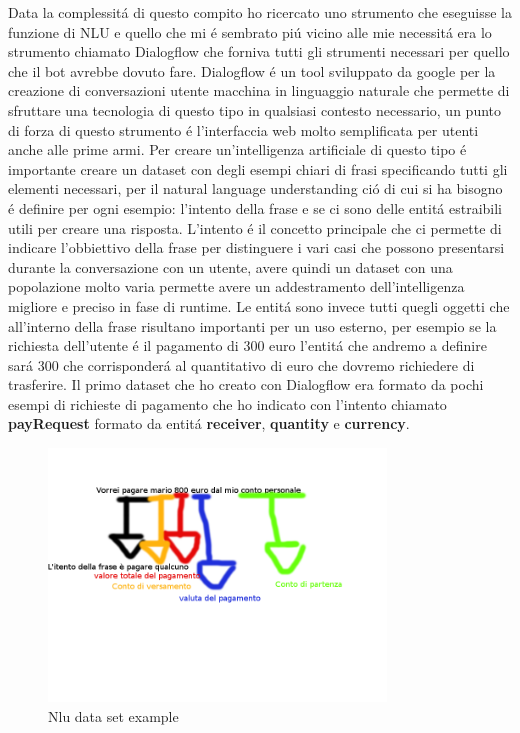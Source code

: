 Data la complessit\'a di questo compito ho ricercato uno strumento che eseguisse la funzione di NLU e quello che mi \'e sembrato pi\'u vicino alle mie necessit\'a era lo strumento chiamato Dialogflow che forniva tutti gli strumenti necessari per quello che il bot avrebbe dovuto fare.
Dialogflow \'e un tool sviluppato da google per la creazione di conversazioni utente macchina in linguaggio naturale che permette di sfruttare una tecnologia di questo tipo in qualsiasi contesto necessario, un punto di forza di questo strumento \'e l'interfaccia web molto semplificata per utenti anche alle prime armi.
Per creare un'intelligenza artificiale di questo tipo \'e importante creare un dataset con degli esempi chiari di frasi specificando tutti gli elementi necessari, per il natural language understanding ci\'o di cui si ha bisogno \'e definire per ogni esempio: l'intento della frase e se ci sono delle entit\'a estraibili utili per creare una risposta.
L'intento \'e il concetto principale che ci permette di indicare l'obbiettivo della frase per distinguere i vari casi che possono presentarsi durante la conversazione con un utente, avere quindi un dataset con una popolazione molto varia permette avere un addestramento dell'intelligenza migliore e preciso in fase di runtime.
Le entit\'a sono invece tutti quegli oggetti che all'interno della frase risultano importanti per un uso esterno, per esempio se la richiesta dell'utente \'e il pagamento di 300 euro l'entit\'a che andremo a definire sar\'a 300 che corrisponder\'a al quantitativo di euro che dovremo richiedere di trasferire.  
Il primo dataset che ho creato con Dialogflow era formato da pochi esempi di richieste di pagamento che ho indicato con l'intento chiamato \textbf{payRequest} formato da entit\'a \textbf{receiver}, \textbf{quantity} e \textbf{currency}.
\begin{figure}[H]
 \centering
  \includegraphics[width=0.8\textwidth]{img/nludatasetexample.png}
 \caption{Nlu data set example}
\end{figure}
